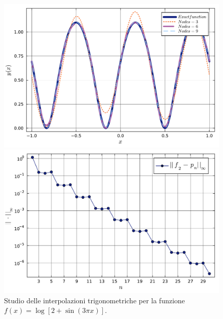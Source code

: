\documentclass[letterpaper, 12pt]{article}
\numberwithin{equation}{section}    %
\begin{document}
\begin{figure}[!ht]
    \centering
    \begin{minipage}[b]{0.40\textwidth}
        \includegraphics[width=\textwidth]{4613.pdf}
    \end{minipage}
    \hspace{0.5cm}
    \begin{minipage}[b]{0.40\textwidth}
        \includegraphics[width=\textwidth]{4614.pdf}
    \end{minipage}
    \caption{Studio delle interpolazioni trigonometriche per la funzione $f(x) = \log [2+ \sin (3 \pi x ) ]$.}
    \label{fig:es4_6_1_2}
\end{figure}
\end{document}
